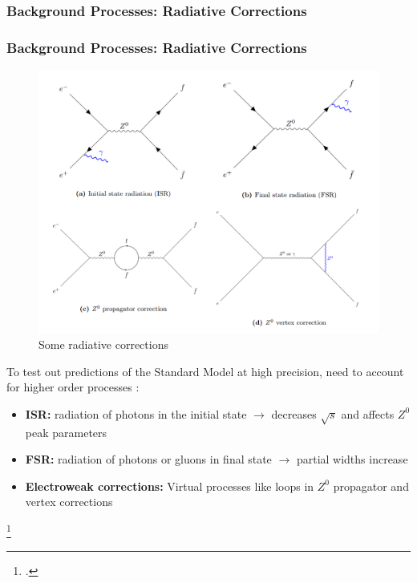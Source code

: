 \documentclass[10pt]{beamer}
\begin{document}
\subsubsection{Background Processes: Radiative Corrections}
\begin{frame}
\frametitle{Background Processes: Radiative Corrections}
\begin{minipage}{0.5\textwidth}
\begin{figure}
\centering
\includegraphics[width=\textwidth]{corrections}
\caption{Some radiative corrections}
\end{figure}
\end{minipage}\hspace{1em}
\begin{minipage}{0.45\textwidth}
To test out predictions of the Standard Model at high precision, need to account for higher order processes \footnotemark{}:
\begin{itemize}
\item \textbf{ISR:} radiation of photons in the initial state $\rightarrow$ decreases $\sqrt{s}$ and affects $Z^{0}$ peak parameters
\item \textbf{FSR:} radiation of photons or gluons in final state $\rightarrow$ partial widths increase
\item \textbf{Electroweak corrections:} Virtual processes like loops in $Z^{0}$ propagator and vertex corrections
\end{itemize}
\end{minipage}\hfill
\footcitetext{Zedometry}
\end{frame}
\end{document}
